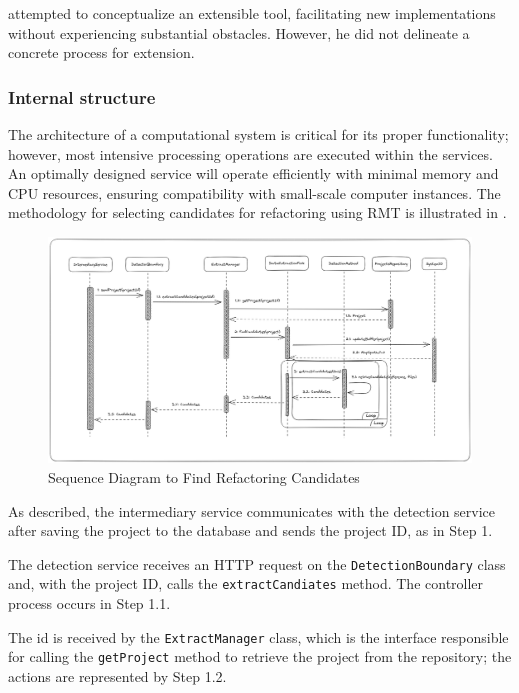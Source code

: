 \textcite{beluzzo2018abordagem} attempted to conceptualize an extensible tool, facilitating new implementations without experiencing substantial obstacles. However, he did not delineate a concrete process for extension.

\subsubsection{Internal structure}
\label{subsub-internal}

The architecture of a computational system is critical for its proper functionality; however, most intensive processing operations are executed within the services. An optimally designed service will operate efficiently with minimal memory and CPU resources, ensuring compatibility with small-scale computer instances. The methodology for selecting candidates for refactoring using RMT is illustrated in .

\begin{figure}[ht!]
\SetCaptionWidth{\textwidth}
\caption{Sequence Diagram to Find Refactoring Candidates}
\label{fig-candidates}
\includegraphics[width=160mm]{Chapter-2/Figures/candidates.png}
\end{figure}
\FloatBarrier

As described, the intermediary service communicates with the detection service after saving the project to the database and sends the project ID, as in Step 1.

The detection service receives an HTTP request on the \texttt{DetectionBoundary} class and, with the project ID, calls the \texttt{extractCandiates} method. The controller process occurs in Step 1.1.

The id is received by the \texttt{ExtractManager} class, which is the interface responsible for calling the \texttt{getProject} method to retrieve the project from the repository; the actions are represented by Step 1.2.

